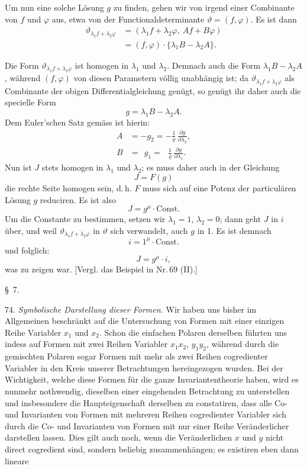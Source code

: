 Um nun eine solche Lösung $g$ zu finden, gehen wir von irgend einer Combinante von $f$ und $\varphi$ aus, etwa von der Functionaldeterminante $\vartheta=(f,\varphi)$. Es ist dann
\[
\begin{aligned}
\vartheta_{\lambda_1 f+\lambda_2\varphi}&=(\lambda_1 f+\lambda_2\varphi,\ Af+B\varphi)\\
&=(f,\varphi)\cdot\{\lambda_1 B-\lambda_2 A\}.
\end{aligned}
\]


Die Form $\vartheta_{\lambda_1 f+\lambda_2\varphi}$ ist homogen in $\lambda_1$ und $\lambda_2$. Demnach auch die Form $\lambda_1 B-\lambda_2 A$, während $(f,\varphi)$ von diesen Parametern völlig unabhängig ist; da $\vartheta_{\lambda_1 f+\lambda_2\varphi}$ als Combinante der obigen Differentialgleichung genügt, so genügt ihr daher auch die specielle Form
\[
g=\lambda_1 B-\lambda_2 A.
\]
Dem Euler'schen Satz gemäss ist hierin:
\[
\begin{aligned}
A&=-g_2=-\frac{1}{\varrho}\,\frac{\partial g}{\partial\lambda_2},\\
B&=\ \ g_1=\ \ \ \frac{1}{\varrho}\,\frac{\partial g}{\partial\lambda_1}.
\end{aligned}
\]
Nun ist $J$ stets homogen in $\lambda_1$ und $\lambda_2$; es muss daher auch in der Gleichung
\[
J=F(g)
\]
die rechte Seite homogen sein, d.\,h. $F$ muss sich auf eine Potenz der particulären Lösung $g$ reduciren. Es ist also
\[
J=g^\mu\cdot\mathrm{Const.}
\]
Um die Constante zu bestimmen, setzen wir $\lambda_1=1$, $\lambda_2=0$; dann geht $J$ in $i$ über, und weil $\vartheta_{\lambda_1 f+\lambda_2\varphi}$ in $\vartheta$ sich verwandelt, auch $g$ in 1. Es ist demnach
\[
i=1^\mu\cdot\mathrm{Const.}
\]
und folglich:
\[
J=g^\mu\cdot i,
\]
was zu zeigen war. [Vergl. das Beispiel in Nr.\,69 (II).]

\begin{center}
\S~7.\\
\end{center}

74. \textit{Symbolische Darstellung dieser Formen.} Wir haben uns bisher im Allgemeinen beschränkt auf die Untersuchung von Formen mit einer einzigen Reihe Variabler $x_1$ und $x_2$. Schon die einfachen Polaren derselben führten uns indess auf Formen mit zwei Reihen Variabler $x_1x_2$, $y_1y_2$, während durch die gemischten Polaren sogar Formen mit mehr als zwei Reihen cogredienter Variabler in den Kreis unserer Betrachtungen hereingezogen wurden. Bei der Wichtigkeit, welche diese Formen für die ganze Invariantentheorie haben, wird es nunmehr nothwendig, dieselben einer eingehenden Betrachtung zu unterstellen und insbesondere die Haupteigenschaft derselben zu constatiren, dass alle Co- und Invarianten von Formen mit mehreren Reihen cogredienter Variabler sich durch die Co- und Invarianten von Formen mit nur einer Reihe Veränderlicher darstellen lassen. Dies gilt auch noch, wenn die Veränderlichen $x$ und $y$ nicht direct cogredient sind, sondern beliebig zusammenhängen; es existiren eben dann lineare


